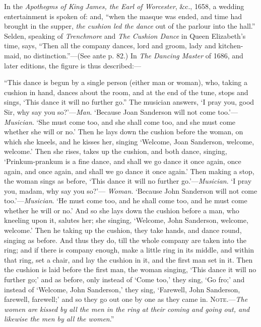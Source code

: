 In the \textit{Apothegms of King James, \pagebreak the Earl of Worcester}, \&c., 1658, a wedding
entertainment is spoken of: and, “when the masque was ended, and time had
brought in the supper, \textit{the cushion led the dance} out of the parlour into the hall.”
Selden, speaking of \textit{Trenchmore} and \textit{The Cushion Dance} in Queen Elizabeth’s
time, says, “Then all the company dances, lord and groom, lady and kitchen-maid, 
no distinction.”—(See ante p. 82.) In \textit{The Dancing Master} of 1686, and
later editions, the figure is thus described:—

“This dance is begun by a single person (either man or woman), who, taking a
cushion in hand, dances about the room, and at the end of the tune, stops and sings,
‘This dance it will no further go.” The musician answers, ‘I pray you, good Sir,
why say you so?’—\textit{Man}. ‘Because Joan Sanderson will not come too.’—\textit{Musician}.
‘She must come too, and she shall come too, and she must come whether she will
or no.’ Then he lays down the cushion before the woman, on which she kneels, and
he kisses her, singing ‘Welcome, Joan Sanderson, welcome, welcome.’ Then she
rises, takes up the cushion, and both dance, singing, ‘Prinkum-prankum is a fine dance,
and shall we go dance it once again, once again, and once again, and shall we go dance
it once again.’ Then making a stop, the woman sings as before, ‘This dance it will
no further go.’—\textit{Musician}. ‘I pray you, madam, why say you so?'— \textit{Woman}. ‘Because
John Sanderson will not come too.’—\textit{Musician}. ‘He must come too, and he shall
come too, and he must come whether he will or no.’ And so she lays down the
cushion before a man, who kneeling upon it, salutes her; she singing, ‘Welcome,
John Sanderson, welcome, welcome.’ Then he taking up the cushion, they take
hands, and dance round, singing as before. And thus they do, till the whole company
are taken into the ring; and if there is company enough, make a little ring in its
middle, and within that ring, set a chair, and lay the cushion in it, and the first man
set in it. Then the cushion is laid before the first man, the woman singing, ‘This
dance it will no further go;’ and as before, only instead of ‘Come too,’ they sing, ‘Go
fro;’ and instead of ‘Welcome, John Sanderson,’ they sing, ‘Farewell, John Sanderson,
farewell, farewell;’ and so they go out one by one as they came in. \textsc{Note}.—\textit{The
women are kissed by all the men in the ring at their coming and going out, and likewise
the men by all the women}.”

